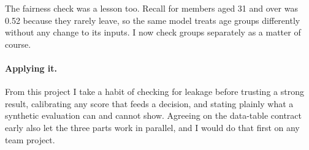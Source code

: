 The fairness check was a lesson too. Recall for members aged 31 and over was 0.52 because they rarely leave, so the same model treats age groups differently without any change to its inputs. I now check groups separately as a matter of course.

\paragraph{Applying it.} From this project I take a habit of checking for leakage before trusting a strong result, calibrating any score that feeds a decision, and stating plainly what a synthetic evaluation can and cannot show. Agreeing on the data-table contract early also let the three parts work in parallel, and I would do that first on any team project.

